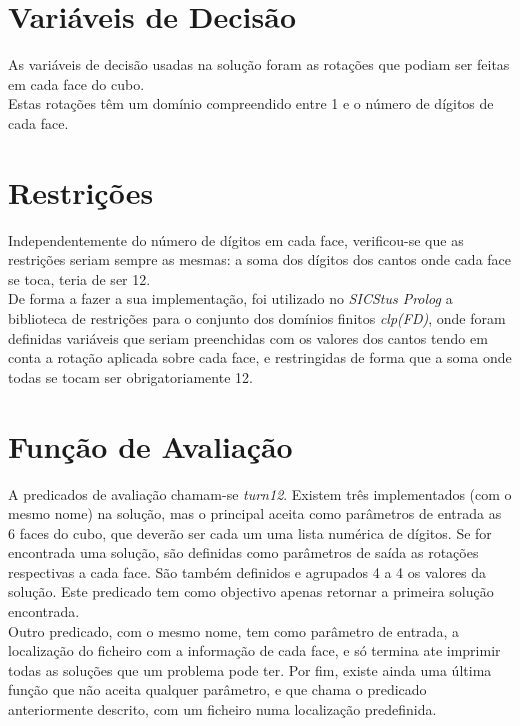 %
%
%


\section{Variáveis de Decisão}
\label{restr:1}

As variáveis de decisão usadas na solução foram as rotações que podiam ser feitas em cada face do cubo.\\
Estas rotações têm um domínio compreendido entre 1 e o número de dígitos de cada face.

\section{Restrições}
\label{restr:2}

Independentemente do número de dígitos em cada face, verificou-se que as restrições seriam sempre as mesmas: a soma dos dígitos dos cantos onde cada face se toca, teria de ser 12.\\

De forma a fazer a sua implementação, foi utilizado no \textit{SICStus Prolog} a biblioteca de restrições para o conjunto dos domínios finitos \textit{clp(FD)}, onde foram definidas variáveis que seriam preenchidas com os valores dos cantos tendo em conta a rotação aplicada sobre cada face, e restringidas de forma que a soma onde todas se tocam ser obrigatoriamente 12.

\section{Função de Avaliação}
\label{restr:3}

A predicados de avaliação chamam-se \textit{turn12}. Existem três implementados (com o mesmo nome) na solução, mas o principal aceita como parâmetros de entrada as 6 faces do cubo, que deverão ser cada um uma lista numérica de dígitos. Se for encontrada uma solução, são definidas como parâmetros de saída as rotações respectivas a cada face. São também definidos e agrupados 4 a 4 os valores da solução. Este predicado tem como objectivo apenas retornar a primeira solução encontrada.\\
Outro predicado, com o mesmo nome, tem como parâmetro de entrada, a localização do ficheiro com a informação de cada face, e só termina ate imprimir todas as soluções que um problema pode ter.
Por fim, existe ainda uma última função que não aceita qualquer parâmetro, e que chama o predicado anteriormente descrito, com um ficheiro numa localização predefinida.


